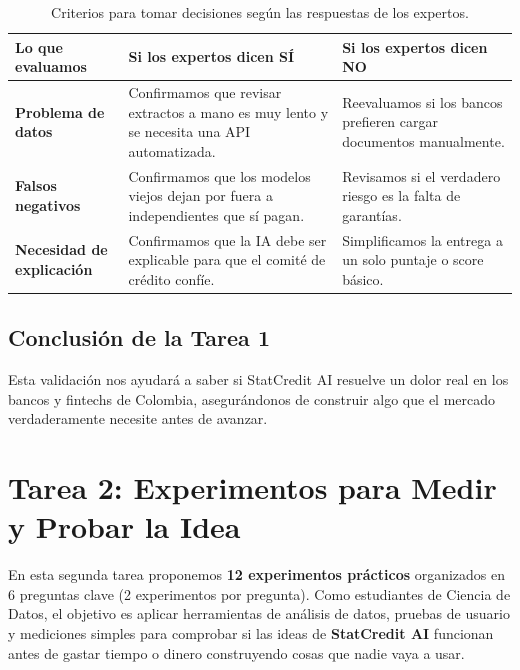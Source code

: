 \documentclass[11pt,a4paper]{article}
\begin{document}
\begin{table}[h!]
\centering
\small
\begin{tabularx}{\textwidth}{l X X}
\toprule
Lo que evaluamos & Si los expertos dicen SÍ & Si los expertos dicen NO \\
\midrule
\textbf{Problema de datos} & Confirmamos que revisar extractos a mano es muy lento y se necesita una API automatizada. & Reevaluamos si los bancos prefieren cargar documentos manualmente. \\
\textbf{Falsos negativos} & Confirmamos que los modelos viejos dejan por fuera a independientes que sí pagan. & Revisamos si el verdadero riesgo es la falta de garantías. \\
\textbf{Necesidad de explicación} & Confirmamos que la IA debe ser explicable para que el comité de crédito confíe. & Simplificamos la entrega a un solo puntaje o score básico. \\
\bottomrule
\end{tabularx}
\caption{Criterios para tomar decisiones según las respuestas de los expertos.}
\end{table}

\subsection{Conclusión de la Tarea 1}
Esta validación nos ayudará a saber si StatCredit AI resuelve un dolor real en los bancos y fintechs de Colombia, asegurándonos de construir algo que el mercado verdaderamente necesite antes de avanzar.

\newpage
\section{Tarea 2: Experimentos para Medir y Probar la Idea}

\begin{tcolorbox}[colback=primary!5,colframe=primary,title=\textbf{¿De qué trata este entregable?}]
En esta segunda tarea proponemos \textbf{12 experimentos prácticos} organizados en 6 preguntas clave (2 experimentos por pregunta). Como estudiantes de Ciencia de Datos, el objetivo es aplicar herramientas de análisis de datos, pruebas de usuario y mediciones simples para comprobar si las ideas de \textbf{StatCredit AI} funcionan antes de gastar tiempo o dinero construyendo cosas que nadie vaya a usar.
\end{tcolorbox}
\end{document}
